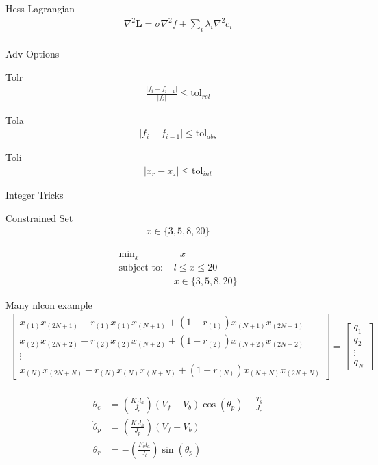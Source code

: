 \documentclass{article}
\begin{document}
Hess Lagrangian
\begin{align*}
    \nabla^2 \mathbf{L} = \sigma \nabla^2 f + \sum_i \lambda_i \nabla^2 c_i\\
\end{align*}

Adv Options

Tolr
\begin{align*}
    \frac{\left| f_i - f_{i-1} \right|}{\left| f_i \right|}  \le \text{tol}_{rel}
\end{align*}

Tola
\begin{align*}
    \left| f_i - f_{i-1}\right| \le \text{tol}_{abs}
\end{align*}

Toli
\begin{align*}
    \left| x_r - x_z \right| \le \text{tol}_{int}
\end{align*}

Integer Tricks

Constrained Set
\begin{align*}
    x \in \{3,5,8,20\}
\end{align*}

\begin{align*}
    \text{min}_x & \text{ } x \\
    \mbox{subject to: } & l \le x \le 20\\
                        & x \in \{3,5,8,20\}
\end{align*}

Many nlcon example
\begin{align*}
    \begin{bmatrix} x_{(1)} x_{(2N+1)} - r_{(1)} x_{(1)} x_{(N+1)} + (1-r_{(1)}) x_{(N+1)} x_{(2N+1)}\\
                    x_{(2)} x_{(2N+2)} - r_{(2)} x_{(2)} x_{(N+2)} + (1-r_{(2)}) x_{(N+2)} x_{(2N+2)}\\
                    \vdots\\
                    x_{(N)} x_{(2N+N)} - r_{(N)} x_{(N)} x_{(N+N)} + (1-r_{(N)}) x_{(N+N)} x_{(2N+N)}
    \end{bmatrix} = 
    \begin{bmatrix} q_1 \\ q_2 \\ \vdots \\ q_N \end{bmatrix}
\end{align*}

\begin{align} \label{e:3dofheli}
\begin{split}
\ddot{\theta}_e& = \left(\frac{K_f l_a}{J_e} \right) \left(V_f + V_b\right) \cos (\theta_p) - \frac{T_g}{J_e}\\
\ddot{\theta}_p& = \left(\frac{K_f l_h}{J_p} \right) \left(V_f - V_b \right)\\
\ddot{\theta}_r& = -\left(\frac{F_g l_a}{J_t} \right)\sin (\theta_p)
\end{split}
\end{align}
\end{document}
